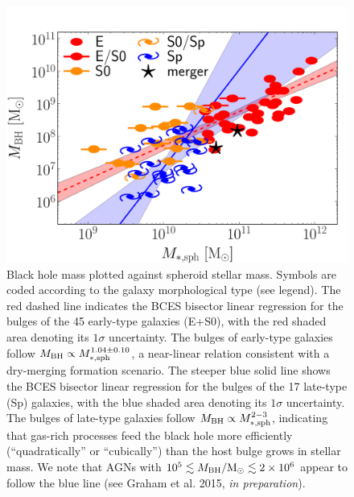 \documentclass[preprint2]{emulateapj}
\begin{document}
\begin{figure}[h]
\begin{center}
\includegraphics[width=\columnwidth]{mbh_vs_mass_sph.pdf}
\caption{Black hole mass plotted against spheroid stellar mass. 
Symbols are coded according to the galaxy morphological type (see legend).
The red dashed line indicates the BCES bisector linear regression for the bulges of the 45 early-type galaxies (E+S0), 
with the red shaded area denoting its $1\sigma$ uncertainty. 
The bulges of early-type galaxies follow $M_{\rm BH} \propto M_{\rm *,sph}^{1.04 \pm 0.10}$,
a near-linear relation consistent with a dry-merging formation scenario.
The steeper blue solid line shows the BCES bisector linear regression for the bulges of the 17 late-type (Sp) galaxies, 
with the blue shaded area denoting its $1\sigma$ uncertainty. 
The bulges of late-type galaxies follow $M_{\rm BH} \propto M_{\rm *,sph}^{2-3}$, 
indicating that gas-rich processes feed the black hole more efficiently (``quadratically'' or ``cubically'') than the host bulge grows in stellar mass. 
We note that AGNs with $10^5 \lesssim M_{\rm BH}/{\rm M_\odot} \lesssim 2 \times 10^6$ \citep{jiang2011a} appear to follow the blue line 
(see Graham et al. 2015, \emph{in preparation}).}
\label{fig:mbhmasssph}
\end{center}
\end{figure}
\end{document}
